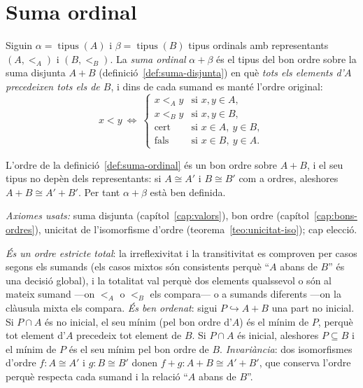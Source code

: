 \section{Suma ordinal}\label{sec:suma-ordinal}

\begin{definicio}\label{def:suma-ordinal}
Siguin \(\alpha=\operatorname{tipus}(A)\) i \(\beta=\operatorname{tipus}(B)\)
tipus ordinals amb representants \((A,<_A)\) i \((B,<_B)\). La \emph{suma
ordinal} \(\alpha+\beta\) és el tipus del bon ordre sobre la suma disjunta
\(A+B\) (definició~\ref{def:suma-disjunta}) en què \emph{tots els elements
d'\(A\) precedeixen tots els de \(B\)}, i dins de cada sumand es manté l'ordre
original:
\[
x<y
\ \Longleftrightarrow\
\begin{cases}
x<_A y & \text{si } x,y\in A,\\
x<_B y & \text{si } x,y\in B,\\
\text{cert} & \text{si } x\in A,\ y\in B,\\
\text{fals} & \text{si } x\in B,\ y\in A.
\end{cases}
\]
\end{definicio}

\begin{proposicio}\label{prop:suma-bon-ordre}
L'ordre de la definició~\ref{def:suma-ordinal} és un bon ordre sobre \(A+B\),
i el seu tipus no depèn dels representants: si \(A\cong A'\) i \(B\cong B'\)
com a ordres, aleshores \(A+B\cong A'+B'\). Per tant \(\alpha+\beta\) està ben
definida.\par
\emph{Axiomes usats:} suma disjunta (capítol~\ref{cap:valors}), bon ordre
(capítol~\ref{cap:bons-ordres}), unicitat de l'isomorfisme d'ordre
(teorema~\ref{teo:unicitat-iso}); cap elecció.
\end{proposicio}

\begin{prova}
\emph{És un ordre estricte total}: la irreflexivitat i la transitivitat es
comproven per casos segons els sumands (els casos mixtos són consistents
perquè \enquote{\(A\) abans de \(B\)} és una decisió global), i la totalitat
val perquè dos elements qualssevol o són al mateix sumand ---on \(<_A\) o
\(<_B\) els compara--- o a sumands diferents ---on la clàusula mixta els
compara. \emph{És ben ordenat}: sigui \(P\hookrightarrow A+B\) una part no
inicial. Si \(P\cap A\) és no inicial, el seu mínim (pel bon ordre d'\(A\)) és
el mínim de \(P\), perquè tot element d'\(A\) precedeix tot element de \(B\).
Si \(P\cap A\) és inicial, aleshores \(P\subseteq B\) i el mínim de \(P\) és el
seu mínim pel bon ordre de \(B\). \emph{Invariància}: dos isomorfismes d'ordre
\(f\colon A\cong A'\) i \(g\colon B\cong B'\) donen \(f+g\colon A+B\cong A'+B'\),
que conserva l'ordre perquè respecta cada sumand i la relació
\enquote{\(A\) abans de \(B\)}.
\end{prova}

